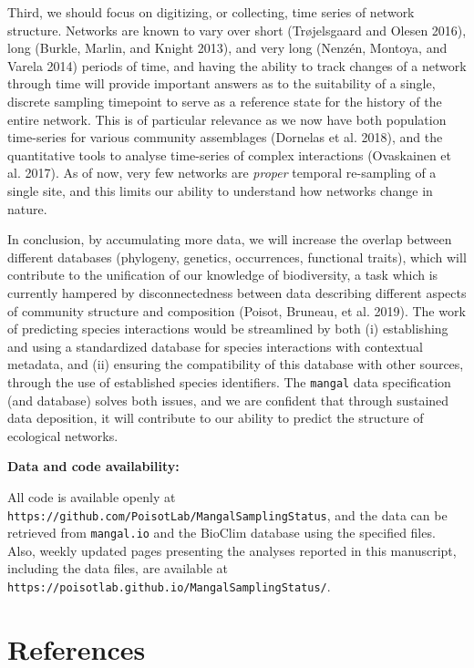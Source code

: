 \documentclass[10pt,oneside]{article}
\begin{document}
Third, we should focus on digitizing, or collecting, time series of
network structure. Networks are known to vary over short (Trøjelsgaard
and Olesen 2016), long (Burkle, Marlin, and Knight 2013), and very long
(Nenzén, Montoya, and Varela 2014) periods of time, and having the
ability to track changes of a network through time will provide
important answers as to the suitability of a single, discrete sampling
timepoint to serve as a reference state for the history of the entire
network. This is of particular relevance as we now have both population
time-series for various community assemblages (Dornelas et al. 2018),
and the quantitative tools to analyse time-series of complex
interactions (Ovaskainen et al. 2017). As of now, very few networks are
\emph{proper} temporal re-sampling of a single site, and this limits our
ability to understand how networks change in nature.

In conclusion, by accumulating more data, we will increase the overlap
between different databases (phylogeny, genetics, occurrences,
functional traits), which will contribute to the unification of our
knowledge of biodiversity, a task which is currently hampered by
disconnectedness between data describing different aspects of community
structure and composition (Poisot, Bruneau, et al. 2019). The work of
predicting species interactions would be streamlined by both (i)
establishing and using a standardized database for species interactions
with contextual metadata, and (ii) ensuring the compatibility of this
database with other sources, through the use of established species
identifiers. The \texttt{mangal} data specification (and database)
solves both issues, and we are confident that through sustained data
deposition, it will contribute to our ability to predict the structure
of ecological networks.

\textbf{Data and code availability:}

All code is available openly at
\texttt{https://github.com/PoisotLab/MangalSamplingStatus}, and the data
can be retrieved from \texttt{mangal.io} and the BioClim database using
the specified files. Also, weekly updated pages presenting the analyses
reported in this manuscript, including the data files, are available at
\texttt{https://poisotlab.github.io/MangalSamplingStatus/}.

\hypertarget{references}{%
\section*{References}\label{references}}
\end{document}
